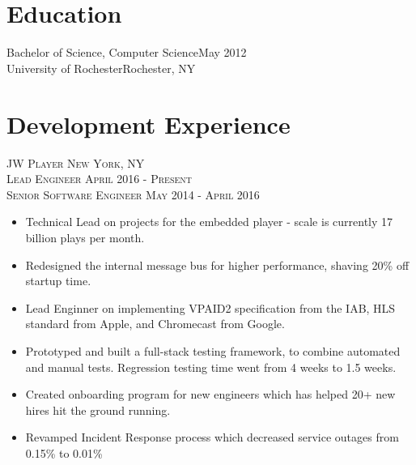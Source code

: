 \documentclass[oneside, final]{scrartcl}
\begin{document}
\begin{center}
 
\textsc{\LARGE{}}\\
\\

\section{Education}
Bachelor of Science, Computer Science\hfill May 2012\\
University of Rochester\hfill Rochester, NY\\

\section{Development Experience}
\textsc{JW Player \hfill New York, NY\\}
\textsc{Lead Engineer \hfill April 2016 - Present\\}
\textsc{Senior Software Engineer \hfill May 2014 - April 2016\\}
\begin{itemize}
	\setlength{\itemsep}{1pt}
	\setlength{\parskip}{0pt}
	\setlength{\parsep}{0pt}
	\setlength{\leftmargin}{-5mm}
	\item Technical Lead on projects for the embedded player - scale is currently 17 billion plays per month.
	\item Redesigned the internal message bus for higher performance, shaving 20\% off startup time.
	\item Lead Enginner on implementing VPAID2 specification from the IAB, HLS standard from Apple, and Chromecast from Google.
	\item Prototyped and built a full-stack testing framework, to combine automated and manual tests. Regression testing time went from 4 weeks to 1.5 weeks.
	\item Created onboarding program for new engineers which has helped 20+ new hires hit the ground running.
	\item Revamped Incident Response process which decreased service outages from 0.15\% to 0.01\%
\end{itemize}


\end{center}
\end{document}

